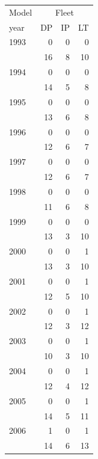 \begin{tabular}{lrrr}
\toprule
Model & \multicolumn{3}{c}{Fleet} \\
year & DP & IP & LT \\
\midrule
1993 & 0 & 0 & 0 \\
 & 16 & 8 & 10 \\
1994 & 0 & 0 & 0 \\
 & 14 & 5 & 8 \\
1995 & 0 & 0 & 0 \\
 & 13 & 6 & 8 \\
1996 & 0 & 0 & 0 \\
 & 12 & 6 & 7 \\
1997 & 0 & 0 & 0 \\
 & 12 & 6 & 7 \\
1998 & 0 & 0 & 0 \\
 & 11 & 6 & 8 \\
1999 & 0 & 0 & 0 \\
 & 13 & 3 & 10 \\
2000 & 0 & 0 & 1 \\
 & 13 & 3 & 10 \\
2001 & 0 & 0 & 1 \\
 & 12 & 5 & 10 \\
2002 & 0 & 0 & 1 \\
 & 12 & 3 & 12 \\
2003 & 0 & 0 & 1 \\
 & 10 & 3 & 10 \\
2004 & 0 & 0 & 1 \\
 & 12 & 4 & 12 \\
2005 & 0 & 0 & 1 \\
 & 14 & 5 & 11 \\
2006 & 1 & 0 & 1 \\
 & 14 & 6 & 13 \\
\bottomrule
\end{tabular}

